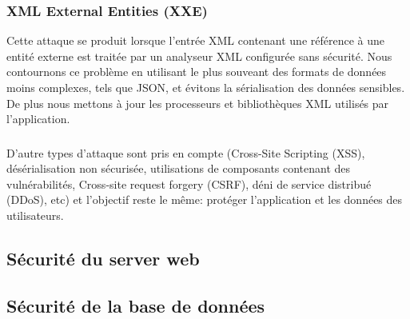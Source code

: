    \subsubsection{XML External Entities (XXE)}   
    Cette attaque se produit lorsque l'entrée XML contenant une référence à une entité externe est 
    traitée par un analyseur XML configurée sans sécurité. 
    Nous contournons ce problème en utilisant le plus souveant des formats de données moins complexes, tels que JSON, 
    et évitons la sérialisation des données sensibles. De plus nous mettons à jour les processeurs et bibliothèques 
    XML utilisés par l'application. 

    \subsubsection{}
    \paragraph{}
    D'autre types d'attaque sont pris en compte (Cross-Site Scripting (XSS), 
    désérialisation non sécurisée, utilisations de composants contenant des vulnérabilités,
    Cross-site request forgery (CSRF), déni de service distribué (DDoS), etc) 
    et l'objectif reste le même: protéger l'application et les données des utilisateurs.

\subsection{Sécurité du server web}

\subsection{Sécurité de la base de données}



